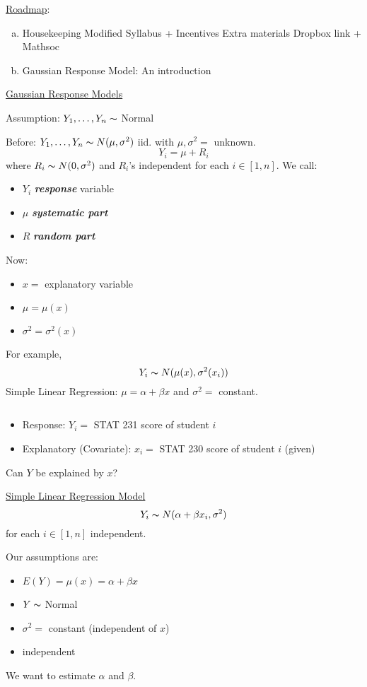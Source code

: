 \underline{Roadmap}:
\begin{enumerate}[(a)]
    \item Housekeeping
          \subitem Modified Syllabus + Incentives
          \subitem Extra materials
          \subitem Dropbox link + Mathsoc
    \item Gaussian Response Model: An introduction
\end{enumerate}
\underline{Gaussian Response Models}

Assumption: $ Y_1,\ldots ,Y_n \thicksim $ Normal

Before: $ Y_1,\ldots ,Y_n \thicksim N(\mu,\sigma^2) $ iid.
with $ \mu,\sigma^2= $ unknown.
\[ Y_i=\mu+R_i \]
where $ R_i \thicksim N(0,\sigma^2) $ and $ R_i $'s independent
for each $ i\in[1,n] $. We call:
\begin{itemize}
    \item $ Y_i $ \textbf{\emph{response}} variable
    \item $ \mu $ \textbf{\emph{systematic part}}
    \item $ R $ \textbf{\emph{random part}}
\end{itemize}

Now:
\begin{itemize}
    \item $ x= $ explanatory variable
    \item $ \mu=\mu(x) $
    \item $ \sigma^2=\sigma^2(x) $
\end{itemize}
For example,
\[ Y_i \thicksim N(\mu(x),\sigma^2(x_i)) \]
Simple Linear Regression: $ \mu=\alpha+\beta x $
and $ \sigma^2 = $ constant.

\begin{exbox}
    \begin{example} $ \; $
        \begin{itemize}
            \item Response: $ Y_i= $ STAT 231 score of student $ i $
            \item Explanatory (Covariate): $ x_i= $ STAT 230 score of student $ i $
                  (given)
        \end{itemize}
        Can $ Y $ be explained by $ x $?

        \underline{Simple Linear Regression Model}
        \[ Y_i \thicksim N(\alpha+\beta x_i,\sigma^2) \]
        for each $ i\in[1,n] $ independent.

        Our assumptions are:
        \begin{itemize}
            \item $ E(Y)=\mu(x)=\alpha+\beta x $
            \item $ Y \thicksim $ Normal
            \item $ \sigma^2= $ constant (independent of $ x $)
            \item independent
        \end{itemize}
        We want to estimate $ \alpha $ and $ \beta $.
    \end{example}
\end{exbox}
